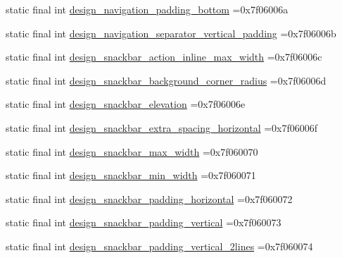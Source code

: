 \begin{DoxyCompactItemize}
static final int \mbox{\hyperlink{classcom_1_1example_1_1trainawearapplication_1_1_r_1_1dimen_a87589be7230b7e94687e7f69ae5c6af5}{design\+\_\+navigation\+\_\+padding\+\_\+bottom}} =0x7f06006a
\item 
static final int \mbox{\hyperlink{classcom_1_1example_1_1trainawearapplication_1_1_r_1_1dimen_af2c1f8a5b7697c737c284aed55c35696}{design\+\_\+navigation\+\_\+separator\+\_\+vertical\+\_\+padding}} =0x7f06006b
\item 
static final int \mbox{\hyperlink{classcom_1_1example_1_1trainawearapplication_1_1_r_1_1dimen_a3e22c1d2d48b557050cae144de75cda8}{design\+\_\+snackbar\+\_\+action\+\_\+inline\+\_\+max\+\_\+width}} =0x7f06006c
\item 
static final int \mbox{\hyperlink{classcom_1_1example_1_1trainawearapplication_1_1_r_1_1dimen_a831668116991123da3ffafc0fa87dd1f}{design\+\_\+snackbar\+\_\+background\+\_\+corner\+\_\+radius}} =0x7f06006d
\item 
static final int \mbox{\hyperlink{classcom_1_1example_1_1trainawearapplication_1_1_r_1_1dimen_acb9bfa2c619886cb77a73beae10c485c}{design\+\_\+snackbar\+\_\+elevation}} =0x7f06006e
\item 
static final int \mbox{\hyperlink{classcom_1_1example_1_1trainawearapplication_1_1_r_1_1dimen_aa6899eea6e6e86973720156071a6fdcc}{design\+\_\+snackbar\+\_\+extra\+\_\+spacing\+\_\+horizontal}} =0x7f06006f
\item 
static final int \mbox{\hyperlink{classcom_1_1example_1_1trainawearapplication_1_1_r_1_1dimen_a73d40abe3e96a76027dc01b616888724}{design\+\_\+snackbar\+\_\+max\+\_\+width}} =0x7f060070
\item 
static final int \mbox{\hyperlink{classcom_1_1example_1_1trainawearapplication_1_1_r_1_1dimen_a54e88bc6891c1c670c8f3e7e5e20c363}{design\+\_\+snackbar\+\_\+min\+\_\+width}} =0x7f060071
\item 
static final int \mbox{\hyperlink{classcom_1_1example_1_1trainawearapplication_1_1_r_1_1dimen_a774a88d68448dfb43b356e66ffd2eb7a}{design\+\_\+snackbar\+\_\+padding\+\_\+horizontal}} =0x7f060072
\item 
static final int \mbox{\hyperlink{classcom_1_1example_1_1trainawearapplication_1_1_r_1_1dimen_ad51772a5205c97b375098cb13143315d}{design\+\_\+snackbar\+\_\+padding\+\_\+vertical}} =0x7f060073
\item 
static final int \mbox{\hyperlink{classcom_1_1example_1_1trainawearapplication_1_1_r_1_1dimen_ad3343b5acf6106d806c1991ab9138db6}{design\+\_\+snackbar\+\_\+padding\+\_\+vertical\+\_\+2lines}} =0x7f060074

\end{DoxyCompactItemize}
